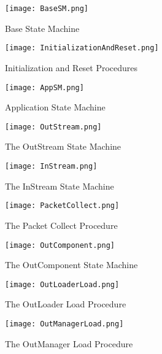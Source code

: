 \documentclass{pnp_article}
\begin{document}
\begin{figure}[h]
 \centering
 \texttt{[image: BaseSM.png]}
 \caption{Base State Machine}
 \label{fig:BaseSM}
\end{figure}

\begin{figure}[h]
 \centering
 \texttt{[image: InitializationAndReset.png]}
 \caption{Initialization and Reset Procedures}
 \label{fig:InitializationAndReset}
\end{figure}

\begin{figure}[h]
 \centering
 \texttt{[image: AppSM.png]}
 \caption{Application State Machine}
 \label{fig:ApplicationSM}
\end{figure}

\begin{figure}[h]
 \centering
 \texttt{[image: OutStream.png]}
 \caption{The OutStream State Machine}
 \label{fig:OutStream}
\end{figure}

\begin{figure}[h]
 \centering
 \texttt{[image: InStream.png]}
 \caption{The InStream State Machine}
 \label{fig:InStream}
\end{figure}

\begin{figure}[h]
 \centering
 \texttt{[image: PacketCollect.png]}
 \caption{The Packet Collect Procedure}
 \label{fig:PacketCollect}
\end{figure}

\begin{figure}[h]
 \centering
 \texttt{[image: OutComponent.png]}
 \caption{The OutComponent State Machine}
 \label{fig:OutComponent}
\end{figure}

\begin{figure}[h]
 \centering
 \texttt{[image: OutLoaderLoad.png]}
 \caption{The OutLoader Load Procedure}
 \label{fig:OutLoaderLoad}
\end{figure}

\begin{figure}[h]
 \centering
 \texttt{[image: OutManagerLoad.png]}
 \caption{The OutManager Load Procedure}
 \label{fig:OutManagerLoad}
\end{figure}
\end{document}
